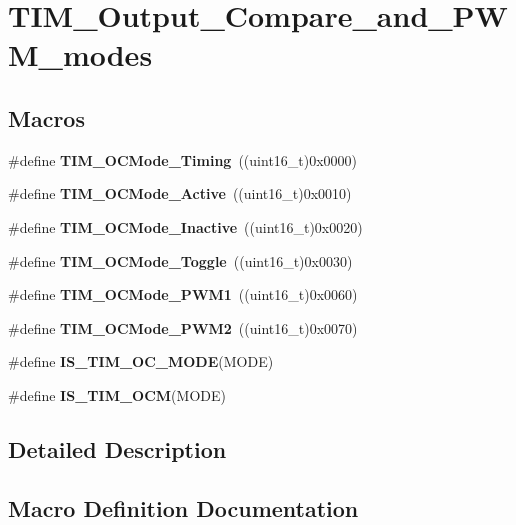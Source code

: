 \section{T\+I\+M\+\_\+\+Output\+\_\+\+Compare\+\_\+and\+\_\+\+P\+W\+M\+\_\+modes}
\label{group__TIM__Output__Compare__and__PWM__modes}
\subsection*{Macros}
\begin{DoxyCompactItemize}
\item 
\#define \textbf{ T\+I\+M\+\_\+\+O\+C\+Mode\+\_\+\+Timing}~((uint16\+\_\+t)0x0000)
\item 
\#define \textbf{ T\+I\+M\+\_\+\+O\+C\+Mode\+\_\+\+Active}~((uint16\+\_\+t)0x0010)
\item 
\#define \textbf{ T\+I\+M\+\_\+\+O\+C\+Mode\+\_\+\+Inactive}~((uint16\+\_\+t)0x0020)
\item 
\#define \textbf{ T\+I\+M\+\_\+\+O\+C\+Mode\+\_\+\+Toggle}~((uint16\+\_\+t)0x0030)
\item 
\#define \textbf{ T\+I\+M\+\_\+\+O\+C\+Mode\+\_\+\+P\+W\+M1}~((uint16\+\_\+t)0x0060)
\item 
\#define \textbf{ T\+I\+M\+\_\+\+O\+C\+Mode\+\_\+\+P\+W\+M2}~((uint16\+\_\+t)0x0070)
\item 
\#define \textbf{ I\+S\+\_\+\+T\+I\+M\+\_\+\+O\+C\+\_\+\+M\+O\+DE}(M\+O\+DE)
\item 
\#define \textbf{ I\+S\+\_\+\+T\+I\+M\+\_\+\+O\+CM}(M\+O\+DE)
\end{DoxyCompactItemize}


\subsection{Detailed Description}


\subsection{Macro Definition Documentation}
\mbox{\label{group__TIM__Output__Compare__and__PWM__modes_ga93d898976e236c135bfd02a0c213c8ec}} 

